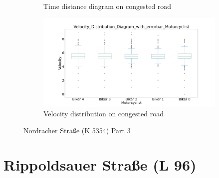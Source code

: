 \begin{figure}[H]
\begin{subfigure}[b]{0.45\textwidth}
        \caption{Time distance diagram on congested road}
    \end{subfigure}
    \hfill
    \begin{subfigure}[b]{0.45\textwidth}
        \centering
        \includegraphics[width=1.0\textwidth]{images/Nordracher/Nordracher_Velocity_Distribution_Diagram_with_errorbar_congested.png}
        \caption{Velocity distribution on congested road}
    \end{subfigure}
    \caption{Nordracher Straße (K 5354) Part 3}
\end{figure}


\section{Rippoldsauer Straße (L 96)}

